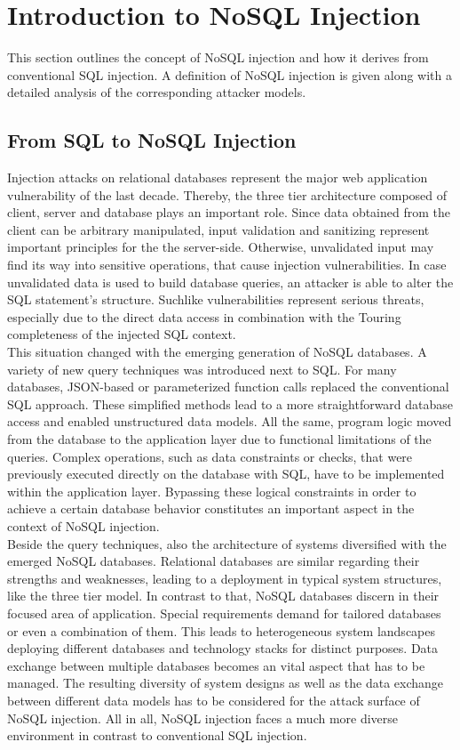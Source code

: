 \chapter{Introduction to NoSQL Injection}
This section outlines the concept of NoSQL injection and how it derives from conventional SQL injection. A definition of NoSQL injection is given along with a detailed analysis of the corresponding attacker models.

\section{From SQL to NoSQL Injection}
\label{sec:fromSQLtoNoSQLinjection}
Injection attacks on relational databases represent the major web application vulnerability of the last decade. Thereby, the three tier architecture composed of client, server and database plays an important role. Since data obtained from the client can be arbitrary manipulated, input validation and sanitizing represent important principles for the the server-side. Otherwise, unvalidated input may find its way into sensitive operations, that cause injection vulnerabilities. In case unvalidated data is used to build database queries, an attacker is able to alter the SQL statement's structure. Suchlike vulnerabilities represent serious threats, especially due to the direct data access in combination with the Touring completeness of the injected SQL context.\\ 

This situation changed with the emerging generation of NoSQL databases. A variety of new query techniques was introduced next to SQL. For many databases, JSON-based or parameterized function calls replaced the conventional SQL approach. These simplified methods lead to a more straightforward database access and enabled unstructured data models. All the same, program logic moved from the database to the application layer due to functional limitations of the queries. Complex operations, such as data constraints or checks, that were previously executed directly on the database with SQL, have to be implemented within the application layer. Bypassing these logical constraints in order to achieve a certain database behavior constitutes an important aspect in the context of NoSQL injection. \\ 

Beside the query techniques, also the architecture of systems diversified with the emerged NoSQL databases. Relational databases are similar regarding their strengths and weaknesses, leading to a deployment in typical system structures, like the three tier model. In contrast to that, NoSQL databases discern in their focused area of application. Special requirements demand for tailored databases or even a combination of them. This leads to heterogeneous system landscapes deploying different databases and technology stacks for distinct purposes. Data exchange between multiple databases becomes an vital aspect that has to be managed. The resulting diversity of system designs as well as the data exchange between different data models has to be considered for the attack surface of NoSQL injection. All in all, NoSQL injection faces a much more diverse environment in contrast to conventional SQL injection.

